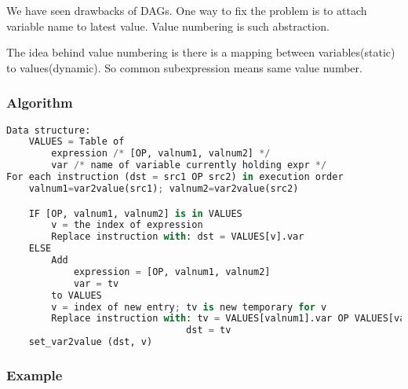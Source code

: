 We have seen drawbacks of DAGs. One way to fix the problem is to attach variable name to latest value. Value numbering is 
such abstraction.

The idea behind value numbering is there is a mapping between variables(static) to values(dynamic). So common subexpression means same 
value number.

\subsubsection{Algorithm}


\begin{lstlisting}[language=python, frame=single,caption=code ,label=lst:vna]
Data structure:
    VALUES = Table of
        expression /* [OP, valnum1, valnum2] */
        var /* name of variable currently holding expr */
For each instruction (dst = src1 OP src2) in execution order
    valnum1=var2value(src1); valnum2=var2value(src2)

    IF [OP, valnum1, valnum2] is in VALUES
        v = the index of expression
        Replace instruction with: dst = VALUES[v].var
    ELSE
        Add
            expression = [OP, valnum1, valnum2]
            var = tv
        to VALUES
        v = index of new entry; tv is new temporary for v
        Replace instruction with: tv = VALUES[valnum1].var OP VALUES[valnum2].var
                                dst = tv
    set_var2value (dst, v)  
\end{lstlisting}


\subsubsection{Example}








